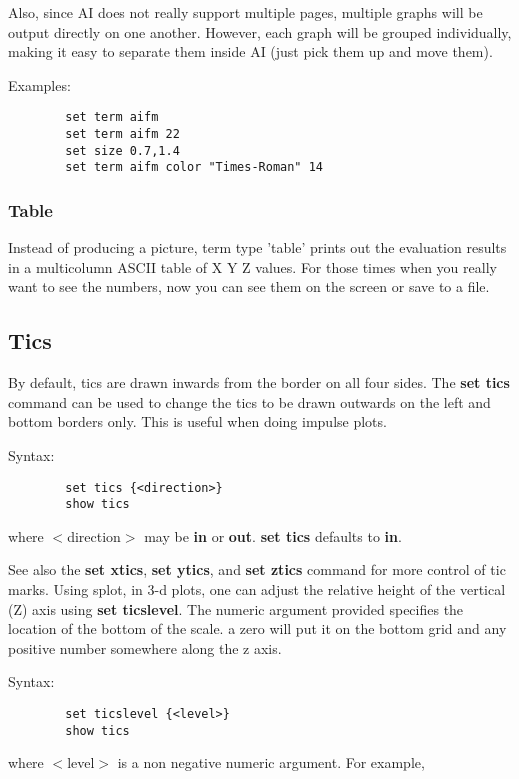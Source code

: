 Also, since AI does not really support multiple pages, multiple 
graphs will be output directly on one another.  However, each graph 
will be grouped individually, making it easy to separate them inside 
AI (just pick them up and move them).

Examples:

\begin{verbatim}
        set term aifm 
        set term aifm 22  
        set size 0.7,1.4
        set term aifm color "Times-Roman" 14 
\end{verbatim}

\subsubsection{Table}
Instead of producing a picture, term type 'table' prints out
the evaluation results in a multicolumn ASCII table of X Y Z values.
For those times when you really want to see the numbers, now you
can see them on the screen or save to a file.

\subsection{Tics}
By default, tics are drawn inwards from the border on all four sides.
The {\bf set tics} command can be used to change the tics to be 
drawn outwards on the left and bottom borders only.
This is useful when doing impulse plots.

Syntax:
\begin{verbatim}
        set tics {<direction>}
        show tics
\end{verbatim}

where $<$direction$>$ may be {\bf in} or {\bf out}. {\bf set tics} defaults to {\bf in}.

See also the {\bf set xtics}, {\bf set ytics}, and {\bf set ztics} command for more
control of tic marks.
Using splot, in 3-d plots, one can adjust the relative height of the
vertical (Z) axis using {\bf set ticslevel}. The numeric argument provided
specifies the location of the bottom of the scale. a zero will put it
on the bottom grid and any positive number somewhere along the z axis.

Syntax:
\begin{verbatim}
        set ticslevel {<level>}
        show tics
\end{verbatim}

where $<$level$>$ is a non negative numeric argument. For example,


